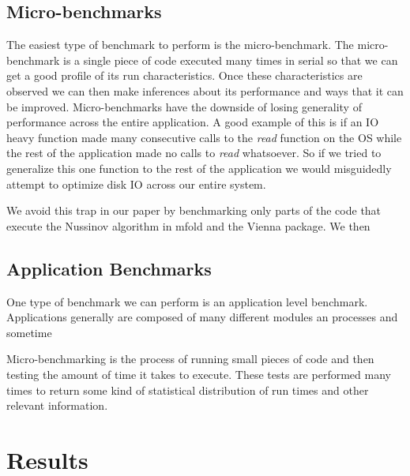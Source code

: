 \documentclass[12pt]{article}
\begin{document}
\subsection{Micro-benchmarks}
The easiest type of benchmark to perform is the micro-benchmark. The micro-benchmark is a single piece of code executed many times in serial so that we can get a good profile of its run characteristics. Once these characteristics are observed we can then make inferences about its performance and ways that it can be improved. Micro-benchmarks have the downside of losing generality of performance across the entire application\cite{eulogy}. A good example of this is if an IO heavy function made many consecutive calls to the \textit{read} function on the OS while the rest of the application made no calls to \textit{read} whatsoever. So if we tried to generalize this one function to the rest of the application we would misguidedly attempt to optimize disk IO across our entire system.
\par We avoid this trap in our paper by benchmarking only parts of the code that execute the Nussinov algorithm in mfold and the Vienna package. We then
\subsection{Application Benchmarks}
One type of benchmark we can perform is an application level benchmark. Applications generally are composed of many different modules an processes and sometime

\par Micro-benchmarking is the process of running small pieces of code and then testing the amount of time it takes to execute. These tests are performed many times to return some kind of statistical distribution of run times and other relevant information.
\section{Results}
\end{document}
